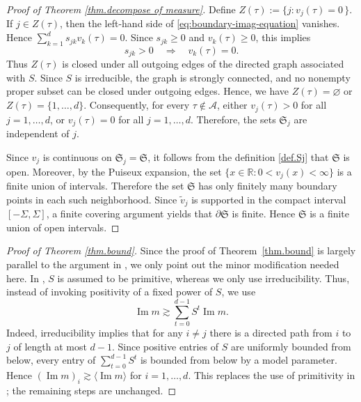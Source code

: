 \documentclass[11pt,twoside, a4paper]{article}
\numberwithin{equation}{section}
\numberwithin{figure}{section}
\theoremstyle{plain} %
\theoremstyle{definition}
\theoremstyle{remark}
\newcommand{\1} {\mspace{1 mu}}
\newcommand{\2} {\mspace{2 mu}}
\DeclareMathOperator{\im}{Im}
\begin{document}
\begin{proof}[Proof of Theorem \ref{thm.decompose of measure}]
Define
$
  Z(\tau):=\{j: v_j(\tau)=0\,\}.
$
If \(j\in Z(\tau)\), then the left-hand side of
\eqref{eq:boundary-imag-equation} vanishes. Hence
$
  \sum_{k=1}^d s_{jk}v_k(\tau)=0.
$
Since \(s_{jk}\ge0\) and \(v_k(\tau)\ge0\), this implies
\[
  s_{jk}>0
  \quad\Longrightarrow\quad
  v_k(\tau)=0.
\]
Thus \(Z(\tau)\) is closed under all outgoing edges of the directed graph
associated with \(S\). Since \(S\) is irreducible, the graph is strongly
connected, and no nonempty proper subset can be closed under outgoing edges.
Hence, we have
$
  Z(\tau)=\varnothing
$
or
$ 
  Z(\tau)=\{1,\dots,d\}.
$
Consequently, for every $\tau\notin\mathcal A$, either $v_j(\tau)>0$ for all $j=1,\dots,d$, or $v_j(\tau)=0$ for all $j=1,\dots,d$. 
Therefore, the sets \(\mathfrak S_j\) are independent of \(j\).



Since \(v_j\) is continuous on \(\mathfrak{S}_j=\mathfrak S\), it follows from the definition \eqref{def.Sj} that \(\mathfrak S\) is open.
Moreover, by the Puiseux expansion, the set
$
  \{x\in\mathbb R:0<v_j(x)<\infty\}
$
is a finite union of intervals.
Therefore the set \(\mathfrak S\) has only finitely many boundary points in
each such neighborhood. Since \(\widetilde v_j\) is supported in the compact
interval \([-\Sigma,\Sigma]\), a finite covering argument yields that
\(\partial\mathfrak S\) is finite. Hence \(\mathfrak S\) is a finite union of
open intervals.
\end{proof}




\bigskip
\begin{proof}[Proof of Theorem \ref{thm.bound}]
    Since the proof of Theorem~\ref{thm.bound} is largely parallel to the argument in
    \cite[Section~5]{AEK2019quadratic}, we only point out the minor modification
    needed here. In \cite{AEK2019quadratic}, \(S\) is assumed to be primitive, whereas
    we only use irreducibility. Thus, instead of invoking positivity of a fixed power
    of \(S\), we use
    \[
    \im m\gtrsim \sum_{t=0}^{d-1}S^t\im m .
    \]
    Indeed, irreducibility implies that for any \(i\ne j\) there is a directed path
    from \(i\) to \(j\) of length at most \(d-1\). Since positive entries of \(S\) are
    uniformly bounded from below, every entry of \(\sum_{t=0}^{d-1}S^t\) is bounded
    from below by a model parameter. Hence
    $
    (\im m)_i\gtrsim \langle \im m\rangle
    $ for $i=1,\dots,d$.
    This replaces the use of primitivity in \cite{AEK2019quadratic}; the remaining
    steps are unchanged.    
\end{proof}
\end{document}
